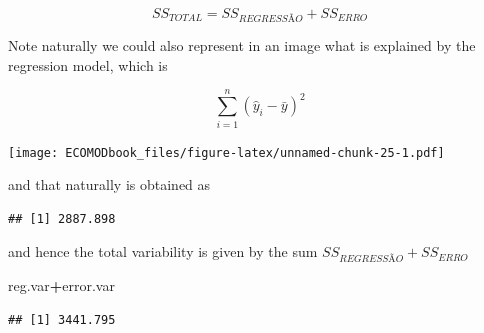 \documentclass[
]{book}
\newenvironment{Shaded}{\begin{snugshade}}{\end{snugshade}}
\newcommand{\CommentTok}[1]{\textcolor[rgb]{0.56,0.35,0.01}{\textit{#1}}}
\newcommand{\DataTypeTok}[1]{\textcolor[rgb]{0.13,0.29,0.53}{#1}}
\newcommand{\DecValTok}[1]{\textcolor[rgb]{0.00,0.00,0.81}{#1}}
\newcommand{\KeywordTok}[1]{\textcolor[rgb]{0.13,0.29,0.53}{\textbf{#1}}}
\newcommand{\NormalTok}[1]{#1}
\newcommand{\OperatorTok}[1]{\textcolor[rgb]{0.81,0.36,0.00}{\textbf{#1}}}
\begin{document}
\[SS_{TOTAL}=SS_{REGRESSÃO}+SS_{ERRO}\]

Note naturally we could also represent in an image what is explained by the regression model, which is

\[\sum_{i=1}^n (\hat y_i- \bar y)^2\]

\begin{Shaded}
\end{Shaded}

\texttt{[image: ECOMODbook\_files/figure-latex/unnamed-chunk-25-1.pdf]}

and that naturally is obtained as

\begin{Shaded}
\end{Shaded}

\begin{verbatim}
## [1] 2887.898
\end{verbatim}

and hence the total variability is given by the sum \(SS_{REGRESSÃO}+SS_{ERRO}\)

\begin{Shaded}
\begin{Highlighting}[]
\NormalTok{reg.var}\OperatorTok{+}\NormalTok{error.var}
\end{Highlighting}
\end{Shaded}

\begin{verbatim}
## [1] 3441.795
\end{verbatim}
\end{document}
